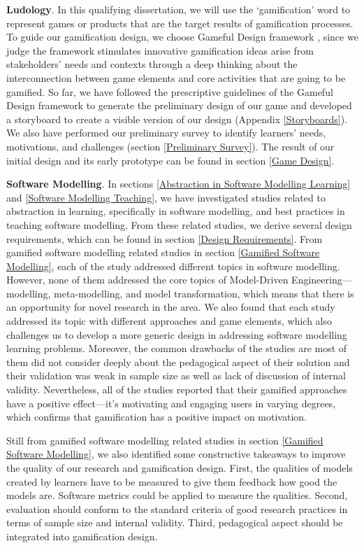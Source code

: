 \documentclass[12pt, a4paper]{report}
\begin{document}
{\textbf{Ludology}. In this qualifying dissertation, we will use the `gamification' word to represent games or products that are the target results of gamification processes. To guide our gamification design, we choose Gameful Design framework \cite{deterding2015lens}, since we judge the framework stimulates innovative gamification ideas arise from stakeholders' needs and contexts through a deep thinking about the interconnection between game elements and core activities that are going to be gamified. So far, we have followed the prescriptive guidelines of the Gameful Design framework to generate the preliminary design of our game and developed a storyboard to create a visible version of our design (Appendix \ref{Storyboards}). We also have performed our preliminary survey to identify learners' needs, motivations, and challenges (section \ref{Preliminary Survey}). The result of our initial design and its early prototype can be found in section \ref{Game Design}.

\textbf{Software Modelling}. In sections \ref{Abstraction in Software Modelling Learning} and \ref{Software Modelling Teaching}, we have investigated studies related to abstraction in learning, specifically in software modelling, and best practices in teaching software modelling. From these related studies, we derive several design requirements, which can be found in section \ref{Design Requirements}.      From gamified software modelling related studies in section \ref{Gamified Software Modelling}, each of the study addressed different topics in software modelling. However, none of them addressed the core topics of Model-Driven Engineering---modelling, meta-modelling, and model transformation, which means that there is an opportunity for novel research in the area. We also found that each study addressed its topic with different approaches and game elements, which also challenges us to develop a more generic design in addressing software modelling learning problems. Moreover, the common drawbacks of the studies are most of them did not consider deeply about the pedagogical aspect of their solution and their validation was weak in sample size as well as lack of discussion of internal validity. Nevertheless, all of the studies reported that their gamified approaches have a positive effect---it's motivating and engaging users in varying degrees, which confirms that gamification has a positive impact on motivation.

Still from gamified software modelling related studies in section \ref{Gamified Software Modelling}, we also identified some constructive takeaways to improve the quality of our research and gamification design. First, the qualities of models created by learners have to be measured to give them feedback how good the models are. Software metrics could be applied to measure the qualities. Second, evaluation should conform to the standard criteria of good research practices in terms of sample size and internal validity. Third, pedagogical aspect should be integrated into gamification design.       

}
\end{document}
